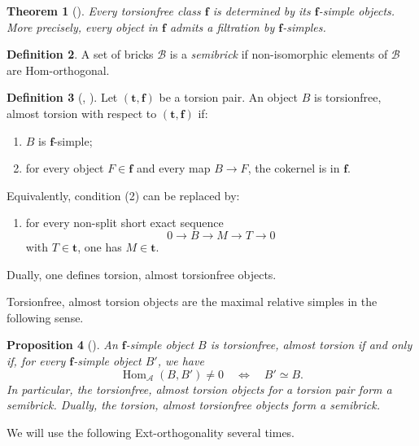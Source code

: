\documentclass[11pt]{amsart}
\newtheorem{theorem}{Theorem}[section]
\newtheorem{proposition}[theorem]{Proposition}
\theoremstyle{definition}
\newtheorem{definition}[theorem]{Definition}
\newcommand{\A}{\mathcal A}
\newcommand{\Hom}{\operatorname{Hom}}
\begin{document}
\begin{theorem}[{\cite[Theorem 2.11]{EnomotoMonobrick}}]\label{thm:f-simples-filter}
Every torsionfree class \(\mathbf f\) is determined by its \(\mathbf f\)-simple objects. More precisely, every object in \(\mathbf f\) admits a filtration by \(\mathbf f\)-simples.
\end{theorem}

\begin{definition}
 A set of bricks $ \mathcal{B} $ is a \emph{semibrick} if non-isomorphic elements of $ \mathcal{B} $ are Hom-orthogonal.
\end{definition}

\begin{definition}[\cite{AngeleriHerzogLaking}, \cite{BCZ}]
Let \((\mathbf t,\mathbf f)\) be a torsion pair. An object \(B\) is torsionfree, almost torsion with respect to \((\mathbf t,\mathbf f)\) if:
\begin{enumerate}[label=\textup{(\arabic*)},leftmargin=2.5em]
\item \(B\) is \(\mathbf f\)-simple;
\item for every object \(F\in\mathbf f\) and every map \(B\to F\), the cokernel is in \(\mathbf f\).
\end{enumerate}
Equivalently, condition \textup{(2)} can be replaced by:
\begin{enumerate}[label=\textup{(2')},leftmargin=2.5em]
\item for every non-split short exact sequence
\[
0\longrightarrow B\longrightarrow M\longrightarrow T\longrightarrow 0
\]
with \(T\in\mathbf t\), one has \(M\in\mathbf t\).
\end{enumerate}
Dually, one defines torsion, almost torsionfree objects.
\end{definition}

Torsionfree, almost torsion objects are the maximal relative simples in the following sense.

\begin{proposition}[{\cite[Lemma 4.4]{EnomotoMonobrick}}]\label{prop:maximal-f-simple}
An \(\mathbf f\)-simple object \(B\) is torsionfree, almost torsion if and only if, for every \(\mathbf f\)-simple object \(B'\), we have
\[
\Hom_\A(B,B')\neq 0
\quad\Longleftrightarrow\quad
B'\simeq B.
\]
In particular, the torsionfree, almost torsion objects for a torsion pair form a semibrick. Dually, the torsion, almost torsionfree objects form a semibrick.
\end{proposition}

We will use the following Ext-orthogonality several times. 
\end{document}
